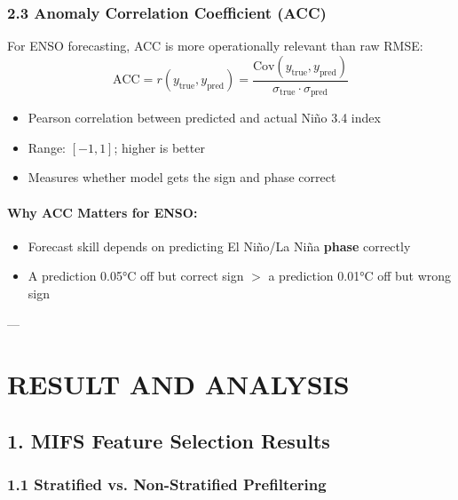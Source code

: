 \documentclass[12pt,a4paper]{article}
\begin{document}
\subsubsection*{2.3 Anomaly Correlation Coefficient (ACC)}

For ENSO forecasting, ACC is more operationally relevant than raw RMSE:
\begin{equation}
\text{ACC} = r(y_{\text{true}}, y_{\text{pred}}) = \frac{\text{Cov}(y_{\text{true}}, y_{\text{pred}})}{\sigma_{\text{true}} \cdot \sigma_{\text{pred}}}
\end{equation}

\begin{itemize}
    \item Pearson correlation between predicted and actual Niño 3.4 index
    \item Range: $[-1, 1]$; higher is better
    \item Measures whether model gets the sign and phase correct
\end{itemize}

\paragraph{Why ACC Matters for ENSO:}
\begin{itemize}
    \item Forecast skill depends on predicting El Niño/La Niña \textbf{phase} correctly
    \item A prediction 0.05°C off but correct sign $>$ a prediction 0.01°C off but wrong sign
\end{itemize}

---

\newpage

\section*{RESULT AND ANALYSIS}

\subsection*{1. MIFS Feature Selection Results}

\subsubsection*{1.1 Stratified vs. Non-Stratified Prefiltering}
\end{document}
